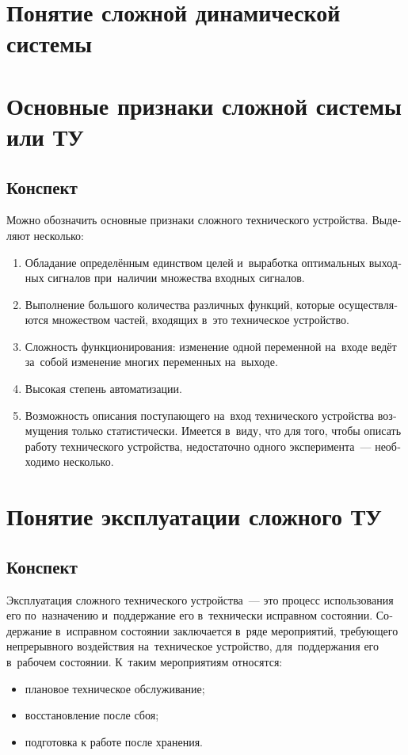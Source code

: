 \documentclass[
	a4paper,
	oneside,
	DIV = 14,
	fontsize = 14pt,
	headings = normal,
]{scrartcl}
\begin{document}
\setlength{\RaggedRightParindent}{\parindent}
\RaggedRight

	\section{Понятие сложной динамической системы}

	\section{Основные признаки сложной системы или ТУ}
		\subsection{Конспект}
		\begin{russian}
			Можно обозначить основные признаки сложного технического устройства. Выделяют несколько:
		\begin{enumerate}
			\item Обладание определённым единством целей и~выработка оптимальных выходных сигналов при~наличии множества входных сигналов.
			\item Выполнение большого количества различных функций, которые осуществляются множеством частей, входящих в~это техническое устройство.
			\item Сложность функционирования: изменение одной переменной на~входе ведёт за~собой изменение многих переменных на~выходе.
			\item Высокая степень автоматизации. 
			\item Возможность описания поступающего на~вход технического устройства возмущения только статистически. Имеется в~виду, что для того, чтобы описать работу технического устройства, недостаточно одного эксперимента~— необходимо несколько.
		\end{enumerate}
		\end{russian}

	\section{Понятие эксплуатации сложного ТУ}
		\subsection{Конспект}
		\begin{russian}
			Эксплуатация сложного технического устройства~— это процесс использования его по~назначению и~поддержание его в~технически исправном состоянии. Содержание в~исправном состоянии заключается в~ряде мероприятий, требующего непрерывного воздействия на~техническое устройство, для~поддержания его в~рабочем состоянии. К~таким мероприятиям относятся:
			\begin{itemize}
				\item плановое техническое обслуживание;
				\item восстановление после сбоя;
				\item подготовка к работе после хранения.
			\end{itemize}
		\end{russian}
\end{document}
